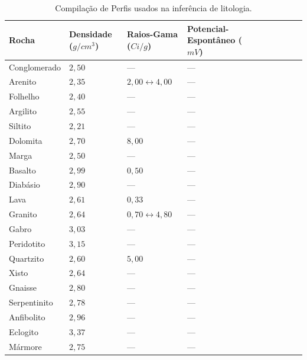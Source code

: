 \begin{table}[H]
	\centering
	\caption{Compilação de Perfis usados na inferência de litologia.}
	\label{rock-properties1}
	\begin{tabular}{@{}llllllllll@{}}
		\toprule
		Rocha         & Densidade ($g/cm^{3}$) & Raios-Gama ($Ci/g$)& Potencial-Espontâneo ($mV$)&   \\ \midrule
		Conglomerado &     $2,50$  &       ---        &    ---        &      \\
		Arenito  &    $2,35$      &       $2,00\leftrightarrow4,00$       &     ---       &      \\
		Folhelho &   $2,40$       &      ---        &      ---      &    \\
		Argilito &     $2,55$   &          ---     &       ---     &     \\
		Siltito  &      $2,21$    &          ---     &       ---     &   \\
		Dolomita &     $2,70$    &        $8,00$       &   ---         &       \\
		Marga  &    $2,50$     &         ---      &    ---        &     \\
		Basalto  &     $2,99$    &          $0,50$     &    ---       &      \\
		Diabásio &    $2,90$    &         ---      &       ---     &     \\
		Lava &     $2,61$    &      $0,33$         &      ---      &      \\
		Granito &    $2,64$      &       $0,70\leftrightarrow4,80$        &      ---      &      \\
		Gabro &    $3,03$     &       ---        &     ---       &       \\
		Peridotito &   $3,15$    &      ---         &     ---       &      \\
		Quartzito &    $2,60$    &        $5,00$      &     ---       &    \\
		Xisto &   $2,64$    &         ---      &      ---      &    \\
		Gnaisse &    $2,80$     &      ---         &    ---        &        \\
		Serpentinito &    $2,78$     &   ---            &   ---     &        \\
		Anfibolito &  $2,96$       &          ---     &       ---     &        \\
		Eclogito &  $3,37$    &       ---        &      ---      &    \\
		Mármore &   $2,75$       &      ---         &     ---       &      \\ \bottomrule
	\end{tabular}
\end{table}

